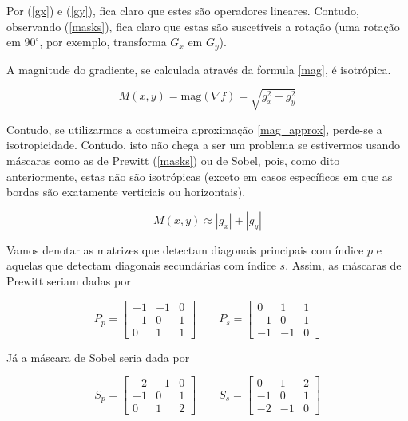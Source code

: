 \documentclass[10pt,a4paper]{article}
\begin{document}
\begin{enumerate}
Por (\ref{gx}) e (\ref{gy}), fica claro que estes são operadores lineares. Contudo, observando (\ref{masks}), fica claro que estas são suscetíveis a rotação (uma rotação em $90^\circ$, por exemplo, transforma $G_x$ em $G_y$).

A magnitude do gradiente, se calculada através da formula \ref{mag}, é isotrópica. 

\begin{equation}
    M (x, y) = \text{mag}(\nabla f) = \sqrt{g^2_x + g^2_y}
\end{equation}

Contudo, se utilizarmos a costumeira aproximação \ref{mag_approx}, perde-se a isotropicidade. Contudo, isto não chega a ser um problema se estivermos usando máscaras como as de Prewitt (\ref{masks}) ou de Sobel, pois, como dito anteriormente, estas não são isotrópicas (exceto em casos específicos em que as bordas são exatamente verticiais ou horizontais).

\begin{equation}
    M (x, y) \approx |g_x| + |g_y|
    \label{mag_approx}
\end{equation}

Vamos denotar as matrizes que detectam diagonais principais com índice $p$ e aquelas que detectam diagonais secundárias com índice $s$. Assim, as máscaras de Prewitt seriam dadas por

\[P_p = \left[\begin{array}{ccc}
  -1 & -1 & 0 \\
  -1 &  0 & 1 \\
  0  &  1 & 1
\end{array}\right]
\qquad
P_s = \left[\begin{array}{ccc}
  0 & 1 & 1 \\
  -1 &  0 & 1 \\
  -1  & -1 & 0
\end{array}\right]
\]

Já a máscara de Sobel seria dada por

\[S_p = \left[\begin{array}{ccc}
  -2 & -1 & 0 \\
  -1 &  0 & 1 \\
  0  &  1 & 2
\end{array}\right]
\qquad
S_s = \left[\begin{array}{ccc}
  0 & 1 & 2 \\
  -1 &  0 & 1 \\
  -2  & -1 & 0
\end{array}\right]
\]


\end{enumerate}
\end{document}
